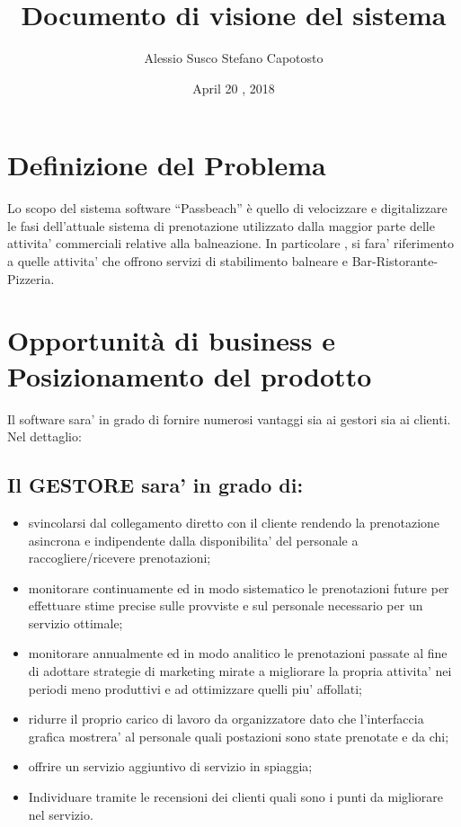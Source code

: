 \documentclass[a4paper]{article}
\begin{document}
\title{Documento di visione del sistema}
\date{April 20 , 2018}
\maketitle
\author{Alessio Susco \hspace*{6cm} Stefano Capotosto}

\tableofcontents

\clearpage

\section{Definizione del Problema}
Lo scopo del sistema software “Passbeach” è quello di velocizzare e digitalizzare le fasi dell’attuale sistema di prenotazione utilizzato dalla maggior parte delle attivita’ commerciali relative alla balneazione. In particolare , si fara’ riferimento a quelle attivita’ che offrono servizi di stabilimento balneare e Bar-Ristorante-Pizzeria.



\section{Opportunità di business e Posizionamento del prodotto}
Il software sara’ in grado di fornire numerosi vantaggi sia ai gestori sia ai clienti.
Nel dettaglio:

\subsection{Il GESTORE sara’ in grado di:}

\begin{itemize}
\item svincolarsi dal collegamento diretto con il cliente rendendo la prenotazione asincrona e indipendente dalla disponibilita’ del personale a raccogliere/ricevere prenotazioni;
\item monitorare continuamente ed in modo sistematico le prenotazioni future per effettuare stime precise sulle provviste e sul personale necessario per un servizio ottimale;
\item monitorare annualmente ed in modo analitico le prenotazioni passate al fine di adottare strategie di marketing mirate a migliorare la propria attivita’ nei periodi meno produttivi e ad ottimizzare quelli piu’ affollati;
\item ridurre il proprio carico di lavoro da organizzatore dato che l’interfaccia grafica mostrera’ al personale quali postazioni sono state prenotate e da chi;
\item offrire un servizio aggiuntivo di servizio in spiaggia;
\item Individuare tramite le recensioni dei clienti quali sono i punti da migliorare nel servizio.
\end{itemize}
\end{document}
